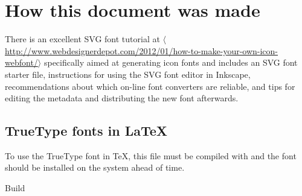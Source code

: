 \documentclass[10pt,letterpaper]{article}
\newcommand{\URL}[1]{$\langle$\url{#1}$\rangle$}
\begin{document}
\section{How this document was made}

There is an excellent SVG font tutorial at
\URL{http://www.webdesignerdepot.com/2012/01/how-to-make-your-own-icon-webfont/}
specifically aimed at generating icon fonts and includes an SVG font
starter file, instructions for using the SVG font editor in Inkscape,
recommendations about which on-line font converters are reliable, and tips for
editing the metadata and distributing the new font afterwards.

\subsection{TrueType fonts in {\LaTeX}}

To use the TrueType font in \TeX, this file must be compiled with 
and the font should be installed on the system ahead of time.




\vfill
{\tiny Build }
\end{document}
